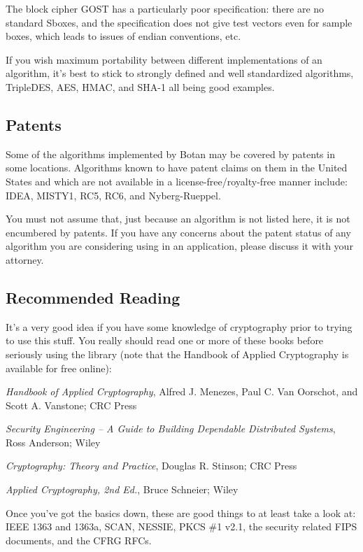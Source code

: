 \documentclass{article}
\begin{document}
The block cipher GOST has a particularly poor specification: there are no
standard Sboxes, and the specification does not give test vectors even for
sample boxes, which leads to issues of endian conventions, etc.

If you wish maximum portability between different implementations of an
algorithm, it's best to stick to strongly defined and well standardized
algorithms, TripleDES, AES, HMAC, and SHA-1 all being good examples.

\subsection{Patents}

Some of the algorithms implemented by Botan may be covered by patents in some
locations. Algorithms known to have patent claims on them in the United States
and which are not available in a license-free/royalty-free manner include:
IDEA, MISTY1, RC5, RC6, and Nyberg-Rueppel.

You must not assume that, just because an algorithm is not listed here, it is
not encumbered by patents. If you have any concerns about the patent status of
any algorithm you are considering using in an application, please discuss it
with your attorney.

\subsection{Recommended Reading}

It's a very good idea if you have some knowledge of cryptography prior
to trying to use this stuff. You really should read one or more of
these books before seriously using the library (note that the Handbook
of Applied Cryptography is available for free online):

\setlength{\parskip}{5pt}

\noindent
\textit{Handbook of Applied Cryptography}, Alfred J. Menezes,
Paul C. Van Oorschot, and Scott A. Vanstone; CRC Press

\noindent
\textit{Security Engineering -- A Guide to Building Dependable Distributed
Systems}, Ross Anderson; Wiley

\noindent
\textit{Cryptography: Theory and Practice}, Douglas R. Stinson; CRC Press

\noindent
\textit{Applied Cryptography, 2nd Ed.}, Bruce Schneier; Wiley

\noindent
Once you've got the basics down, these are good things to at least take a look
at: IEEE 1363 and 1363a, SCAN, NESSIE, PKCS \#1 v2.1, the security related FIPS
documents, and the CFRG RFCs.
\end{document}
